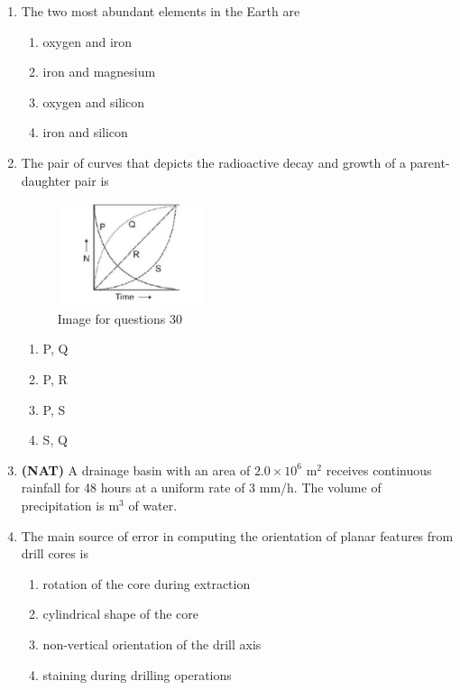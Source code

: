\documentclass[journal,12pt,onecolumn]{IEEEtran}
\theoremstyle{remark}
\begin{document}
\begin{enumerate}
\item The two most abundant elements in the Earth are  
\begin{multicols}{2}
\begin{enumerate}
\item oxygen and iron  
\item iron and magnesium  
\item oxygen and silicon  
\item iron and silicon  
\end{enumerate}
\end{multicols}

\item The pair of curves that depicts the radioactive decay and growth of a parent-daughter pair is  

\begin{figure}[H]
    \centering
    \includegraphics[width=0.4\textwidth]{figs/fig6.png}
    \caption{Image for questions 30}
    \label{fig:question30}
\end{figure}

\begin{multicols}{2}
\begin{enumerate}
\item P, Q  
\item P, R  
\item P, S  
\item S, Q  
\end{enumerate}
\end{multicols}

\item \textbf{(NAT)} A drainage basin with an area of \(2.0 \times 10^6\) m\(^2\) receives continuous rainfall for 48 hours at a uniform rate of 3 mm/h. The volume of precipitation is \underline{\hspace{3cm}} m\(^3\) of water.  
\vspace{0.6cm}

\item The main source of error in computing the orientation of planar features from drill cores is  
\begin{enumerate}
\item rotation of the core during extraction  
\item cylindrical shape of the core  
\item non-vertical orientation of the drill axis  
\item staining during drilling operations  
\end{enumerate}


\end{enumerate}
\end{document}
